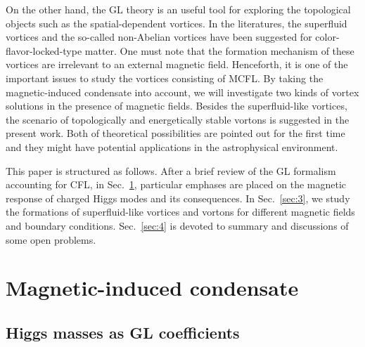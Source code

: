 \documentclass[prd, showpacs,nofootinbib,amsmath,amssymb]{revtex4}
\begin{document}
On the other hand, the GL theory is an useful tool for exploring the topological objects such
as the spatial-dependent vortices. In the literatures, the superfluid vortices and the so-called non-Abelian vortices have been suggested for color-flavor-locked-type matter.
One must note that the formation mechanism of these vortices are irrelevant to an external magnetic
field. Henceforth, it is one of the important issues to study the vortices consisting of MCFL. By taking
the magnetic-induced condensate into account, we will investigate two kinds of vortex solutions in the presence of magnetic fields.
Besides the superfluid-like vortices, the scenario of
topologically and energetically stable vortons is suggested in the present work. Both of theoretical possibilities
are pointed out for the first time and they might have potential applications in the astrophysical environment.

This paper is structured as follows. After a brief review of the GL formalism accounting for CFL, in
Sec.~\ref{sec:2}, particular emphases are placed on the magnetic response of charged Higgs modes and its
consequences. In Sec.~\ref{sec:3}, we study the formations of superfluid-like vortices and vortons 
for different magnetic fields and boundary conditions. Sec.~\ref{sec:4} is
devoted to summary and discussions of some open problems.

\section{Magnetic-induced condensate}
\label{sec:2}
\subsection{Higgs masses as GL coefficients}
\label{sssec:1}
%
\end{document}
